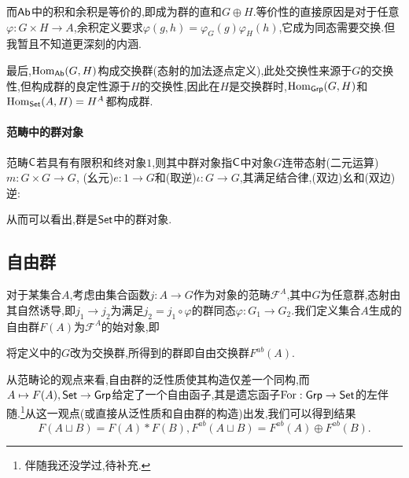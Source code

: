 \documentclass[11pt]{article} %
\begin{document}
而$\mathsf{Ab}$中的积和余积是等价的,即成为群的直和$G\oplus H$.等价性的直接原因是对于任意$\varphi:G\times H\to A$,余积定义要求$\varphi(g,h)=\varphi_G(g)\varphi_H(h)$,它成为同态需要交换.但我暂且不知道更深刻的内涵.

最后,$\operatorname{Hom}_{\mathsf{Ab}}(G,H)$构成交换群(态射的加法逐点定义),此处交换性来源于$G$的交换性,但构成群的良定性源于$H$的交换性,因此在$H$是交换群时,$\operatorname{Hom}_{\mathsf{Grp}}(G,H)$和$\operatorname{Hom}_{\mathsf{Set}}(A,H)=H^A$都构成群.

\paragraph{范畴中的群对象}
范畴$\mathsf{C}$若具有有限积和终对象$1$,则其中群对象指$\mathsf{C}$中对象$G$连带态射(二元运算)$m:G\times G\to G$, (幺元)$e:1\to G$和(取逆)$\iota:G\to G$,其满足结合律,(双边)幺和(双边)逆:


从而可以看出,群是$\mathsf{Set}$中的群对象.

\subsection{自由群}
对于某集合$A$,考虑由集合函数$j:A\to G$作为对象的范畴$\mathcal{F}^A$,其中$G$为任意群,态射由其自然诱导,即$j_1\to j_2$为满足$j_2=j_1\circ\varphi$的群同态$\varphi:G_1\to G_2$.我们定义集合$A$生成的自由群$F(A)$为$\mathcal{F}^A$的始对象,即
将定义中的$G$改为交换群,所得到的群即自由交换群$F^{ab}(A)$.

从范畴论的观点来看,自由群的泛性质使其构造仅差一个同构,而$A\mapsto F(A), \mathsf{Set}\to\mathsf{Grp}$给定了一个自由函子,其是遗忘函子$\mathrm{For}:\mathsf{Grp}\to\mathsf{Set}$的左伴随.\footnote{伴随我还没学过,待补充.}从这一观点(或直接从泛性质和自由群的构造)出发,我们可以得到结果
$$F(A\sqcup B)=F(A)*F(B), F^{ab}(A\sqcup B)=F^{ab}(A)\oplus F^{ab}(B).$$
\end{document}
